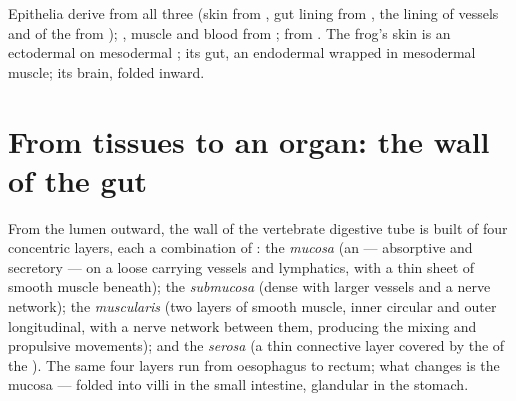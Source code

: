 \begin{example}\label{ex:b1:body-plans-tissues:origin}
Epithelia derive from all three  (skin from , gut
lining from , the lining of vessels and of the  from
); , muscle and blood from ;  from . The frog's skin is an ectodermal  on
mesodermal ; its gut, an endodermal  wrapped
in mesodermal muscle; its brain,  folded inward.
\end{example}

\section{From tissues to an organ: the wall of the gut}

\begin{proposition}\label{prop:b1:body-plans-tissues:gutwall}
From the lumen outward, the wall of the vertebrate digestive tube is
built of four concentric layers, each a combination of : the
\emph{mucosa} (an  --- absorptive and secretory --- on a loose
 carrying vessels and lymphatics, with a thin sheet of
smooth muscle beneath); the \emph{submucosa} (dense 
with larger vessels and a nerve network); the \emph{muscularis} (two
layers of smooth muscle, inner circular and outer longitudinal, with a
nerve network between them, producing the mixing and propulsive
movements); and the \emph{serosa} (a thin connective layer covered by
the  of the ). The same four layers run from oesophagus
to rectum; what changes is the mucosa --- folded into villi in the
small intestine, glandular in the stomach.
\end{proposition}

